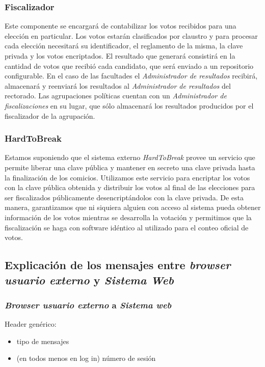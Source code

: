 \subsubsection{Fiscalizador}
Este componente se encargará de contabilizar los votos recibidos para una elección en particular. Los votos estarán clasificados por claustro y para procesar cada elección necesitará su identificador, el reglamento de la misma, la clave privada y los votos encriptados. El resultado que generará consistirá en la cantidad de votos que recibió cada candidato, que será enviado a un repositorio configurable. En el caso de las facultades el \emph{Administrador de resultados} recibirá, almacenará y reenviará los resultados al \emph{Administrador de resultados} del rectorado. Las agrupaciones políticas cuentan con un \emph{Administrador de fiscalizaciones} en su lugar, que sólo almacenará los resultados producidos por el fiscalizador de la agrupación.




\subsubsection{HardToBreak}

Estamos suponiendo que el sistema externo \emph{HardToBreak} provee un servicio que permite liberar una clave pública y mantener en secreto una clave privada hasta la finalización de los comicios.
Utilizamos este servicio para encriptar los votos con la clave pública obtenida y distribuir los votos al final de las elecciones para ser fiscalizados públicamente desencriptándolos con la clave privada. De esta manera, garantizamos que ni siquiera alguien con acceso al sistema pueda obtener información de los votos mientras se desarrolla la votación y permitimos que la fiscalización se haga con software idéntico al utilizado para el conteo oficial de votos.


\subsection{Explicación de los mensajes entre \emph{browser usuario externo} y \emph{Sistema Web}}
\label{mensajes}
\subsubsection{\emph{Browser usuario externo} a \emph{Sistema web}}
Header genérico:
\begin{itemize}
 \item tipo de mensajes
 \item (en todos menos en log in) número de sesión
\end{itemize}

